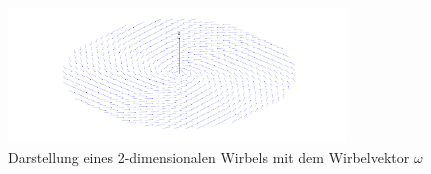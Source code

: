 \begin{figure}
\centering
\includegraphics[width=0.8\textwidth]{papers/wirbelringe/fig/flacher_wirbel.pdf}
\caption{Darstellung eines 2-dimensionalen Wirbels mit dem Wirbelvektor \(\omega\) \label{buch:papers:Wirbelringe:fig:flacher_wirbel}}
\end{figure}